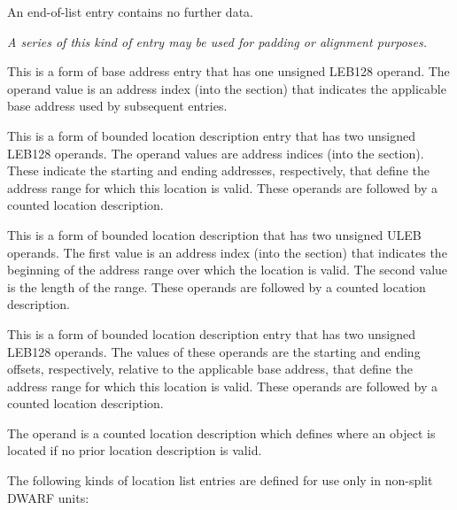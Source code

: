 \begin{enumerate}[1. ]
\itembfnl{\DWLLEendoflistTARG}
An end-of-list entry contains no further data.
       
\textit{A series of this kind of entry may be used for padding or
alignment purposes.}

\itembfnl{\DWLLEbaseaddressxTARG}
This is a form of base address entry that has one unsigned
LEB128 operand. The operand value is an address index (into the 
\dotdebugaddr{} section) that indicates the applicable base address 
used by subsequent \DWLLEoffsetpair{} entries.

\itembfnl{\DWLLEstartxendxTARG}
This is a form of bounded location description entry that
has two unsigned LEB128 operands. The operand values are
address indices (into the \dotdebugaddr{} section). These indicate the
starting and ending addresses, respectively, that define
the address range for which this location is valid.
These operands are followed by a counted location description.

\itembfnl{\DWLLEstartxlengthTARG}
This is a form of bounded location description that has two
unsigned ULEB operands. The first value is an address index 
(into the \dotdebugaddr{} section)
that indicates the beginning of the address range over
which the location is valid.
The second value is the length of the range.
These operands are followed by a counted location description.

\itembfnl{\DWLLEoffsetpairTARG}
This is a form of bounded location description entry that
has two unsigned LEB128 operands. The values of these
operands are the starting and ending offsets, respectively,
relative to the applicable base address, that define the
address range for which this location is valid.
These operands are followed by a counted location description.
       
\itembfnl{\DWLLEdefaultlocationTARG}
The operand is a counted location description which defines 
where an object is located if no prior location description 
is valid.

\end{enumerate}
      
The following kinds of location list entries are defined for
use only in non-split DWARF units:
   
